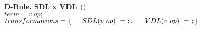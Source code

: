 \textbf{D-Rule. SDL x VDL}~(\mujava{})\\
$term = v~op; $\\
$transformations = \{\\ \indent SDL(v~op)~=~;,\\ \indent VDL(v~op)~=~;\\\}$\\
